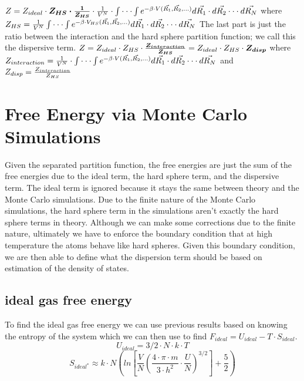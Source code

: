 $\newline Z=Z_{ideal}\cdot \boldsymbol{Z_{HS}\cdot \frac{1}{Z_{HS}}}\cdot \frac{1}{V^N}\cdot \int\cdot\cdot\cdot\int e^{-\beta\cdot V(\vec{R_1},\vec{R_2},...)}d\vec{R_1}\cdot d\vec{R_2}\cdot\cdot\cdot d\vec{R_N}\newline$
where $Z_{HS}=\frac{1}{V^N}\int\cdot\cdot\cdot\int e^{-\beta\cdot V_{HS}(\vec{R_1},\vec{R_2},...)}d\vec{R_1}\cdot d\vec{R_2}\cdot\cdot\cdot d\vec{R_N}\newline$
The last part is just the ratio between the interaction and the hard sphere partition function; we call this the dispersive term.
$\newline Z=Z_{ideal}\cdot Z_{HS}\cdot \boldsymbol{\frac{Z_{interaction}}{Z_{HS}}}=Z_{ideal}\cdot Z_{HS}\cdot \boldsymbol{Z_{disp}}\newline$
where $Z_{interaction}=\frac{1}{V^N}\cdot \int\cdot\cdot\cdot\int e^{-\beta\cdot V(\vec{R_1},\vec{R_2},...)}d\vec{R_1}\cdot d\vec{R_2}\cdot\cdot\cdot d\vec{R_N}\newline$
and $Z_{disp}= \frac{Z_{interaction}}{Z_{HS}}\newline$

\section{Free Energy via Monte Carlo Simulations}
Given the separated partition function, the free energies are just the sum of the free energies due to the ideal term, the hard sphere term, and the dispersive term. The ideal term is ignored because it stays the same between theory and the Monte Carlo simulations. Due to the finite nature of the Monte Carlo simulations, the hard sphere term in the simulations aren't exactly the hard sphere terms in theory. Although we can make some corrections due to the finite nature, ultimately we have to enforce the boundary condition that at high temperature the atoms behave like hard spheres. Given this boundary condition, we are then able to define what the dispersion term should be based on estimation of the density of states.
\subsection{ideal gas free energy}
To find the ideal gas free energy we can use previous results based on knowing the entropy of the system which we can then use to find $F_{ideal}=U_{ideal}-T\cdot S_{ideal}$.
$$U_{ideal}=3/2\cdot N\cdot k\cdot T$$
$$S_{ideal^*}\approx k\cdot N \left ( ln\left [ \frac{V}{N}\left ( \frac{4\cdot \pi\cdot m}{3\cdot h^2}\cdot \frac{U}{N} \right)^{3/2} \right]+\frac{5}{2}\right )$$

